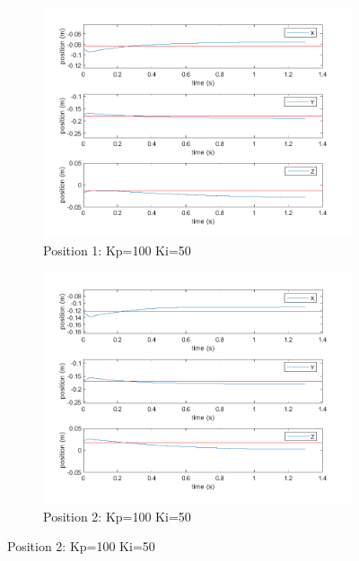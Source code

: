 \begin{figure}[ht]
    \vspace{2pt} %

    \begin{subfigure}[b]{0.45\textwidth}
        \centering
        \includegraphics[width=\linewidth]{Pictures/Controller/Kp100Ki50/1.png}
        \caption{Position 1: Kp=100 Ki=50}
    \end{subfigure}%
    \hfill
    \begin{subfigure}[b]{0.45\textwidth}
        \centering
        \includegraphics[width=\linewidth]{Pictures/Controller/Kp100Ki50/17.png}
        \caption{Position 2: Kp=100 Ki=50}
    \end{subfigure}


\end{figure}
